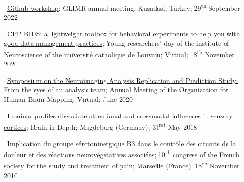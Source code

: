 \textbullet~\href{https://docs.google.com/presentation/d/1508GI_iLxyRwzJtWmnSQuSnfuGEUCaVXHguu8FRA4dI/}{Github workshop};
GLIMR annual meeting;
Kuşadasi, Turkey;
29\textsuperscript{th} September 2022


\textbullet~\href{https://osf.io/y7cjn/}{CPP BIDS: a lightweight toolbox for behavioral experiments to help you with good data management practices};
Young researchers' day of the institute of Neuroscience of the université catholique de Louvain;
Virtual;
18\textsuperscript{th} November 2020

\textbullet~\href{https://osf.io/b8p9e/}{Symposium on the Neuroimaging Analysis
Replication and Prediction Study: From the eyes of an analysis team};
Annual Meeting of the Organization for Human Brain Mapping;
Virtual;
June 2020

\textbullet~\href{https://osf.io/b8p9e/}{Laminar profiles dissociate attentional and crossmodal influences in sensory cortices};
Brain in Depth;
Magdeburg (Germany);
31\textsuperscript{rst} May 2018

\textbullet~\href{https://osf.io/r7gfm/}{Implication du groupe sérotoninergique B3 dans le contrôle des circuits de la douleur et des réactions neurovégétatives associées};
10\textsuperscript{th} congress of the French society for the study and treatment of pain;
Marseille (France);
18\textsuperscript{th} November 2010
